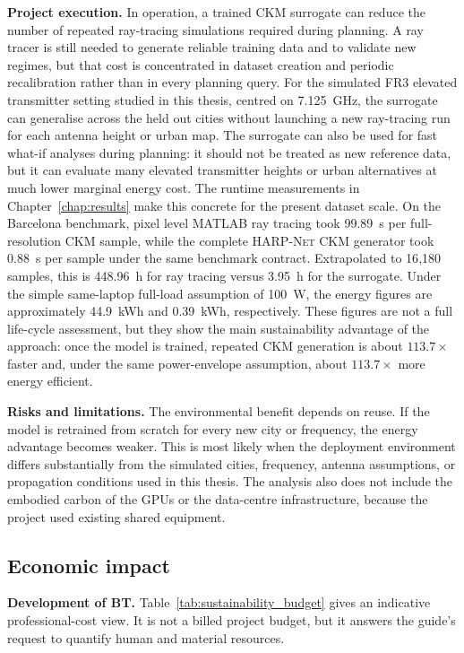 \textbf{Project execution.} In operation, a trained CKM surrogate can reduce
the number of repeated ray-tracing simulations required during planning. A ray tracer is
still needed to generate reliable training data and to validate new regimes,
but that cost is concentrated in dataset creation and periodic recalibration
rather than in every planning query. For the simulated FR3 elevated transmitter
setting studied in this thesis, centred on \SI{7.125}{GHz}, the surrogate can
generalise across the held out cities without launching a new ray-tracing run
for each antenna height or urban map.
The surrogate can also be used for fast what-if analyses during planning:
it should not be treated as new reference data, but it can evaluate
many elevated transmitter heights or urban alternatives at much lower marginal
energy cost.
The runtime measurements in Chapter~\ref{chap:results} make this concrete for
the present dataset scale. On the Barcelona benchmark, pixel level MATLAB ray
tracing took \SI{99.89}{s} per full-resolution CKM sample, while the complete
\textsc{HARP-Net CKM} generator took \SI{0.88}{s} per sample under the same
benchmark contract.
Extrapolated to 16{,}180 samples, this is \SI{448.96}{h} for ray tracing versus
\SI{3.95}{h} for the surrogate. Under the simple same-laptop full-load
assumption of \SI{100}{W}, the energy figures are approximately
\SI{44.9}{kWh} and \SI{0.39}{kWh}, respectively. These figures are not a full
life-cycle assessment, but they show the main sustainability advantage of the
approach: once the model is trained, repeated CKM generation is about
\(113.7\times\) faster and, under the same power-envelope assumption, about
\(113.7\times\) more energy efficient.


\textbf{Risks and limitations.} The environmental benefit depends on reuse. If
the model is retrained from scratch for every new city or frequency, the energy
advantage becomes weaker. This is most likely when the deployment environment
differs substantially from the simulated cities, frequency, antenna assumptions,
or propagation conditions used in this thesis.
The analysis also does not include the embodied carbon of the GPUs or the data-centre infrastructure,
because the project used existing shared equipment.

\subsection{Economic impact}

\textbf{Development of BT.} Table~\ref{tab:sustainability_budget} gives an
indicative professional-cost view. It is not a billed project budget, but it
answers the guide's request to quantify human and material resources.

